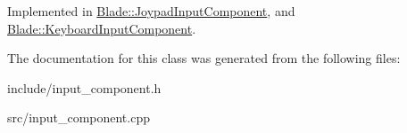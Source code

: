 Implemented in \hyperlink{class_blade_1_1_joypad_input_component_a386bea7c84d17eefa0d40bfa17575e04}{Blade\+::\+Joypad\+Input\+Component}, and \hyperlink{class_blade_1_1_keyboard_input_component_a0945515e8c0513eaa5b536fd4cb2022c}{Blade\+::\+Keyboard\+Input\+Component}.



The documentation for this class was generated from the following files\+:\begin{DoxyCompactItemize}
\item 
include/input\+\_\+component.\+h\item 
src/input\+\_\+component.\+cpp\end{DoxyCompactItemize}
